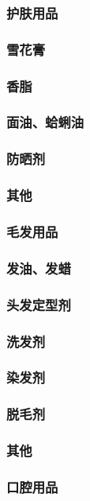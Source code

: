 \documentclass[UTF8]{../../ApplicationUniverse}
\begin{document}
    \subsubsection{护肤用品}
        \subsubsection{雪花膏}
        \subsubsection{香脂}
        \subsubsection{面油、蛤蜊油}
        \subsubsection{防晒剂}
        \subsubsection{其他}
    \subsubsection{毛发用品}
        \subsubsection{发油、发蜡}
        \subsubsection{头发定型剂}
        \subsubsection{洗发剂}
        \subsubsection{染发剂}
        \subsubsection{脱毛剂}
        \subsubsection{其他}
    \subsubsection{口腔用品}
\end{document}
